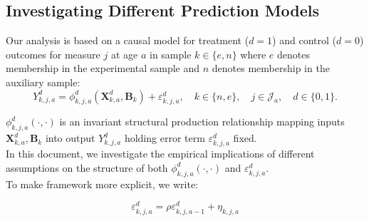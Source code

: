 


\usepackage[stable]{footmisc}

\newcommand*\leftright[2]{%
  \leavevmode
  \rlap{#1}%
  \hspace{0.5\linewidth}%
  #2}

\newcommand{\orth}{\ensuremath{\perp\!\!\!\perp}}%
\newcommand{\indep}{\orth}%
\newcommand{\notorth}{\ensuremath{\perp\!\!\!\!\!\!\diagup\!\!\!\!\!\!\perp}}%
\newcommand{\notindep}{\notorth}







\doublespacing

\subsection{Investigating Different Prediction Models} \label{appendix:predmodels}

\noindent Our analysis is based on a causal model for treatment ($d=1$) and control ($d=0$) outcomes for measure $j$ at age $a$ in sample $k \in \{e,n\}$ where $e$ denotes membership in the experimental sample and $n$ denotes membership in the auxiliary sample:\\

\begin{equation}\label{eq:outcome}
Y^d_{k,j,a} = \phi^d_{k,j,a} (\bm{X}^d_{k,a}, \bm{B}_k) + \varepsilon^d_{k,j,a}, \quad k \in \{n,e\}, \quad j \in \mathcal{J}_a, \quad d \in \{0, 1\}.
\end{equation}

\noindent $\phi^d_{k,j,a}\left( \cdot, \cdot \right)$ is an invariant structural production relationship mapping inputs $\bm{X}^d_{k,a}, \bm{B}_k$ into output $Y^d_{k,j,a}$ holding error term $\varepsilon^d_{k,j,a}$ fixed.\\ 

\noindent In this document, we investigate the empirical implications of different assumptions on the structure of both $\phi_{k,j,a}^d \left( \cdot, \cdot \right)$ and $\varepsilon_{k,j,a}^d$.\\ 

\noindent To make framework more explicit, we write: 

\begin{equation}
\varepsilon^d_{k,j,a} = \rho \varepsilon^d_{k,j,{a-1}} + \eta_{k,j,{a}} \label{eq:error}
\end{equation}

